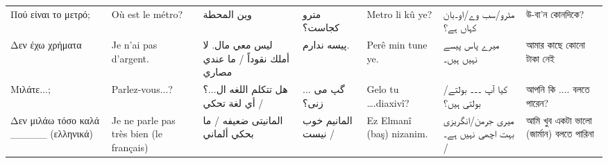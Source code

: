 \begin{longtable}{p{3.5cm} p{3.5cm} p{3.5cm} p{3.5cm} p{3.5cm} p{3.5cm} p{3.5cm} }
 Πού είναι το μετρό;                                                                                                           & Où est le métro?                                                                                & وين المحطة                                                                            & مترو کجاست؟                                                 & Metro li kû ye?                                                                    & مٹرو/سب وے/او۔بان کہاں ہے؟                                                     & উ-বা'ন কোনদিকে?                                                   \\
 Δεν έχω χρήματα                                                                                                               & Je n'ai pas d'argent.                                                                           & ليس معي مال. لا أملك نقوداً   / ما عندي مصاري                                         & پیسه ندارم.                                                 & Perê min tune ye.                                                                  & میرے پاس پیسے نہیں ہیں۔                                                        & আমার কাছে কোনো টাকা নেই                                           \\
 Μιλάτε...;                                                                                                                    & Parlez-vous...?                                                                                 & هل تتکلم اللغە ال...؟      / أي لغة تحكي                                              & ... گپ می زنی؟                                              & Gelo tu ….diaxivî?                                                                 & کیا آپ ۔۔۔ بولتے/بولتی ہیں؟                                                   & আপনি কি .... বলতে পারেন?                                          \\
 Δεν μιλάω τόσο καλά \_\_\_\_\_ (ελληνικά)                                                                                          & Je ne parle pas très bien (le français)                                                         & المانیتی ضعیفە     / ما بحكي ألماني                                                   & المانیم خوب نیست /                                          & Ez Elmanî (baş) nizanim.                                                           & میری جرمن/انگریزی بہت اچھی نہیں ہے۔ /                                          & আমি খুব একটা ভালো (জার্মান) বলতে পারিনা                           \\

\end{longtable}
